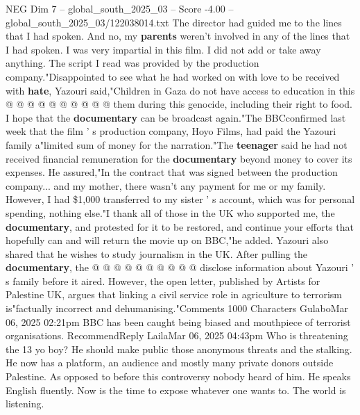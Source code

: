\begin{textsample}{NEG Dim 7 – global\_south\_2025\_03 – Score -4.00 – global\_south\_2025\_03/122038014.txt}
The director had guided me to the lines that I had spoken.
And no, my \textbf{parents} weren't involved in any of the lines that I had spoken.
I was very impartial in this film.
I did not add or take away anything.
The script I read was provided by the production company."Disappointed to see what he had worked on with love to be received with \textbf{hate}, Yazouri said,"Children in Gaza do not have access to education in this @ @ @ @ @ @ @ @ @ @ them during this genocide, including their right to food.
I hope that the \textbf{documentary} can be broadcast again."The BBCconfirmed last week that the film ' s production company, Hoyo Films, had paid the Yazouri family a"limited sum of money for the narration."The \textbf{teenager} said he had not received financial remuneration for the \textbf{documentary} beyond money to cover its expenses.
He assured,"In the contract that was signed between the production company... and my mother, there wasn't any payment for me or my family.
However, I had \$1,000 transferred to my sister ' s account, which was for personal spending, nothing else."I thank all of those in the UK who supported me, the \textbf{documentary}, and protested for it to be restored, and continue your efforts that hopefully can and will return the movie up on BBC,"he added.
Yazouri also shared that he wishes to study journalism in the UK.
After pulling the \textbf{documentary}, the @ @ @ @ @ @ @ @ @ @ disclose information about Yazouri ' s family before it aired.
However, the open letter, published by Artists for Palestine UK, argues that linking a civil service role in agriculture to terrorism is"factually incorrect and dehumanising."Comments 1000 Characters GulaboMar 06, 2025 02:21pm BBC has been caught being biased and mouthpiece of terrorist organisations.
RecommendReply LailaMar 06, 2025 04:43pm Who is threatening the 13 yo boy?
He should make public those anonymous threats and the stalking.
He now has a platform, an audience and mostly many private donors outside Palestine.
As opposed to before this controversy nobody heard of him.
He speaks English fluently.
Now is the time to expose whatever one wants to.
The world is listening.

\end{textsample}
